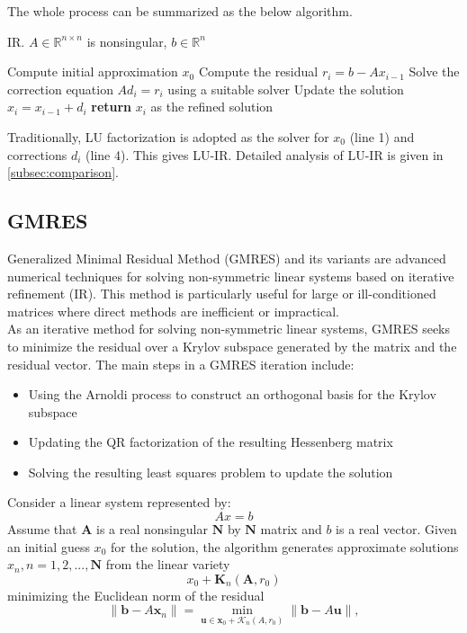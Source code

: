 The whole process can be summarized as the below algorithm.
\begin{algorithm}
\caption{IR. $A \in \mathbb{R}^{n \times n}$ is nonsingular, $b \in \mathbb{R}^n$}
\begin{algorithmic}[1]
    \State Compute initial approximation $x_0$
        \State Compute the residual $r_i = b - Ax_{i-1}$
        \State Solve the correction equation $Ad_i = r_i$ using a suitable solver
        \State Update the solution $x_i = x_{i-1} + d_i$
    \EndFor
    \State \textbf{return} $x_i$ as the refined solution
\end{algorithmic}
\end{algorithm}

Traditionally, LU factorization is adopted as the solver for $x_0$ (line 1) and corrections $d_i$ (line 4). This gives LU-IR. Detailed analysis of LU-IR is given in \ref{subsec:comparison}.


\subsection{GMRES}
Generalized Minimal Residual Method (GMRES) and its variants are advanced numerical techniques for solving non-symmetric linear systems based on iterative refinement (IR). This method is particularly useful for large or ill-conditioned matrices where direct methods are inefficient or impractical. \\
As an iterative method for solving non-symmetric linear systems, GMRES seeks to minimize the residual over a Krylov subspace generated by the matrix and the residual vector. The main steps in a GMRES iteration include\cite{Homer1988}:
\begin{itemize}
    \item Using the Arnoldi process to construct an orthogonal basis for the Krylov subspace
    \item Updating the QR factorization of the resulting Hessenberg matrix
    \item Solving the resulting least squares problem to update the solution
\end{itemize}

Consider a linear system represented by:
\begin{equation}
    Ax=b
\end{equation}
Assume that $\textbf{A}$ is a real nonsingular $\textbf{N}$ by $\textbf{N}$ matrix and $b$ is a real vector. Given an initial guess $x_0$ for the solution, the algorithm generates approximate solutions $x_n,n=1,2,...,\textbf{N}$ from the linear variety
\begin{equation}
    x_0+\textbf{K}_n(\textbf{A},r_0)
\end{equation}
minimizing the Euclidean norm of the residual
\begin{equation}
    \| \mathbf{b} - A\mathbf{x}_n \| = \min_{\mathbf{u} \in \mathbf{x}_0 + \mathcal{K}_n(A,r_0)} \| \mathbf{b} - A\mathbf{u} \|,
\end{equation}

